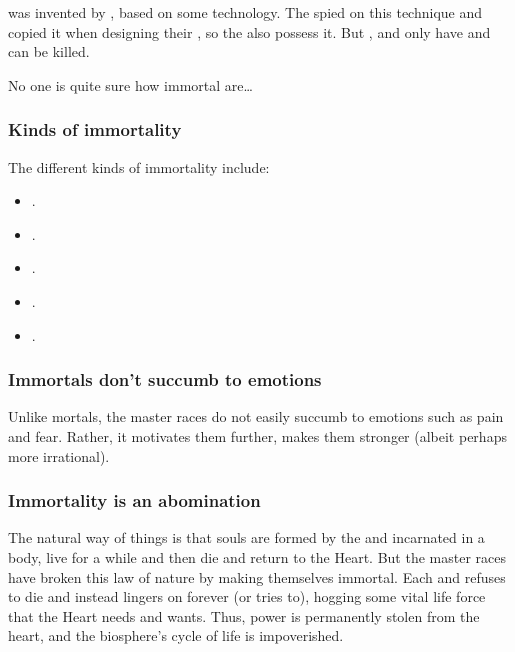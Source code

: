  was invented by \TyarithXserasshana, based on some \xsic{} technology. 
The \banelords{} spied on this technique and copied it when designing their \resphain, so the \resphain{} also possess it. 
But \quiljaaran, \vorcanths{} and \aryothim{} only have  and can be killed. 

No one is quite sure how immortal \banes{} are\ldots{}





\subsubsection{Kinds of immortality}
The different kinds of immortality include: 
\begin{itemize}
  \item {}. 
  \item {}. 
  \item {}. 
  \item {}. 
  \item {}. 
\end{itemize}








\subsubsection{Immortals don't succumb to emotions}
Unlike mortals, the master races do not easily succumb to emotions such as pain and fear. 
Rather, it motivates them further, makes them stronger (albeit perhaps more irrational). 





\subsubsection{Immortality is an abomination}
The natural way of things is that souls are formed by the  and incarnated in a body, live for a while and then die and return to the Heart. 
But the master races have broken this law of nature by making themselves immortal. 
Each \dragon{} and \resphan{} refuses to die and instead lingers on forever (or tries to), hogging some vital life force that the Heart needs and wants. 
Thus, power is permanently stolen from the heart, and the biosphere's cycle of life is impoverished. 

